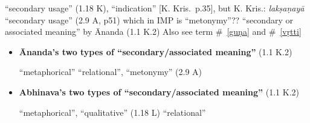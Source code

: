 \documentclass[10pt]{article}
\begin{document}
\begin{multicols}{2}
\begin{enumerate}[
			leftmargin=0em,
			rightmargin=0em,
		]
		 ``secondary usage'' (1.18 K), ``indication'' [K. Kris.\ p.35],
		but K. Kris.: \textit{lakṣaṇayā} ``secondary usage'' (2.9 A, p51) which in IMP is ``metonymy''??
		``secondary or associated meaning'' by Ānanda (1.1 K.2)
		Also see term \#~\ref{guṇa} and \#~\ref{vṛtti}


		\begin{itemize}
			\item \textbf{Ānanda's two types of ``secondary\-/associated meaning''} (1.1 K.2)
			      \begin{enumerate}
				       ``metaphorical''
				       ``relational'', ``metonymy'' (2.9 A)
			      \end{enumerate}

			\item \textbf{Abhinava's two types of ``secondary\-/associated meaning''} (1.1 K.2)
			      \begin{enumerate}
				       ``metaphorical'', ``qualitative'' (1.18 L)
				       ``relational''%
			      \end{enumerate}
		\end{itemize}




\end{enumerate}
\end{multicols}
\end{document}
